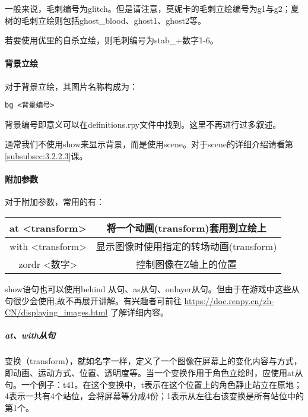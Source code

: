 一般来说，毛刺编号为glitch。但是请注意，莫妮卡的毛刺立绘编号为g1与g2；夏树的毛刺立绘则包括ghost\_blood、ghost1、ghost2等。

若要使用优里的自杀立绘，则毛刺编号为stab\_+数字1-6。

\paragraph{背景立绘}

对于背景立绘，其图片名称构成为：
\begin{lstlisting}
bg <背景编号>
\end{lstlisting}

背景编号即意义可以在definitions.rpy文件中找到。这里不再进行过多叙述。

\begin{ExtraKnowledge}
通常我们不使用show来显示背景，而是使用scene。对于scene的详细介绍请看第\ref{subsubsec:3.2.2.3}课。
\end{ExtraKnowledge}

\paragraph{附加参数}

对于附加参数，常用的有：
\begin{center}
    \tabletail{\hline}
    \tablelasttail{\hline}
    \begin{supertabular}{|c|c|}
        \hline
        at <transform> & 将一个动画(transform)套用到立绘上\\
        \hline
        with <transform> & 显示图像时使用指定的转场动画(transform)\\
        \hline
        zordr <数字> & 控制图像在Z轴上的位置\\
        \hline
    \end{supertabular}
\end{center}

\begin{ExtraKnowledge}
show语句也可以使用behind 从句、as从句、onlayer从句。但由于在游戏中这些从句很少会使用,故不再展开讲解。有兴趣者可前往 \url{https://doc.renpy.cn/zh-CN/displaying_images.html} 了解详细内容。
\end{ExtraKnowledge}

\subparagraph{at、with从句}
\label{subsubsec:3.2.2.1}

变换（transform），就如名字一样，定义了一个图像在屏幕上的变化内容与方式，即动画、运动方式、位置、透明度等。当一个变换作用于角色立绘时，应使用at从句。一个例子：t41。在这个变换中，t表示在这个位置上的角色静止站立在原地；4表示一共有4个站位，会将屏幕等分成4份；1表示从左往右该变换是所有站位中的第1个。

